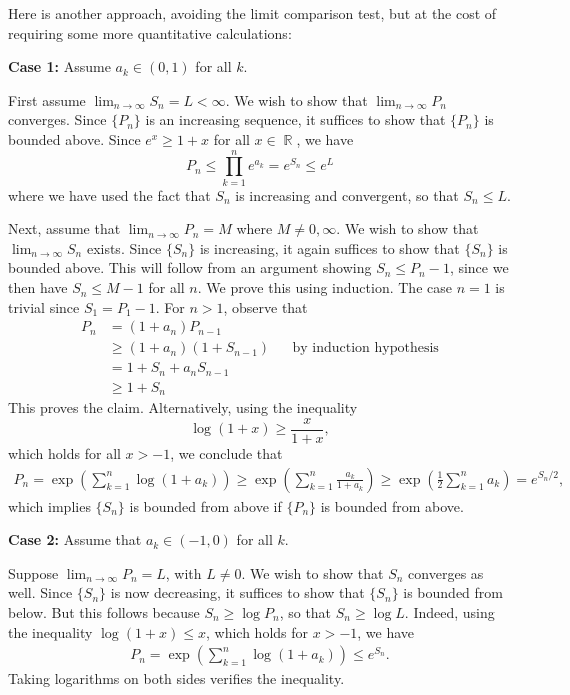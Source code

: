 \documentclass[answers]{exam}
\DeclareMathOperator{\RR}{\mathbb{R}}
\theoremstyle{problemstyle}
\newcommand{\1}[1]{\textbf{1}_{\left[#1\right]}} %
\def\({\left (}
\def\){\right )}
\begin{document}
\begin{questions}
\begin{parts}
\begin{solution}
  	Here is another approach, avoiding the limit comparison test, but at the cost of requiring some more quantitative calculations:

  \textbf{Case 1:} Assume $a_k \in (0,1)$ for all $k$.

  First assume $\lim_{n\to\infty} S_n = L <\infty$. We wish to show that $\lim_{n\to\infty} P_n$ converges. Since $\{ P_n \}$ is an increasing sequence, it suffices to show that $\{ P_n \}$ is bounded above. Since $e^x\geq 1+x$ for all $x \in \RR$, we have
  \begin{equation*}
  P_n \leq \prod_{k=1}^n e^{a_k} = e^{S_n} \leq e^L
  \end{equation*}
  where we have used the fact that $S_n$ is increasing and convergent, so that $S_n \leq L$.
  
  Next, assume that $\lim_{n\to\infty} P_n = M$ where $M \neq 0,\infty$. We wish to show that $\lim_{n\to\infty} S_n$ exists. Since $\{ S_n \}$ is increasing, it again suffices to show that $\{ S_n \}$ is bounded above. This will follow from an argument showing $S_n \leq P_n - 1$, since we then have $S_n \leq M - 1$ for all $n$. We prove this using induction. The case $n=1$ is trivial since $S_1 = P_1 - 1$. For $n>1$, observe that
  \begin{align*}
  P_n 
  &= (1+a_n) P_{n-1}\\
  &\geq (1+a_n)(1+S_{n-1}) &&\text{by induction hypothesis}\\
  &= 1+ S_{n} + a_nS_{n-1}\\
  &\geq 1+S_n
  \end{align*}
  This proves the claim. Alternatively, using the inequality
  \[ \log(1+x)\geq \frac{x}{1+x}, \]
  which holds for all $x>-1$, we conclude that
  \begin{align*}
  P_n = \exp \(\sum_{k=1}^n \log(1+a_k)\) \geq \exp\(\sum_{k=1}^{n} \frac{a_k}{1+a_k} \)\geq \exp\(\frac{1}{2}\sum_{k=1}^n a_k\) = e^{S_n/2},
  \end{align*}
  which implies $\{ S_n \}$ is bounded from above if $\{ P_n \}$ is bounded from above.
  
  \textbf{Case 2:} Assume that $a_k\in (-1,0)$ for all $k$.

  Suppose $\lim_{n\to\infty} P_n = L$, with $L \neq 0$. We wish to show that $S_n$ converges as well. Since $\{ S_n \}$ is now decreasing, it suffices to show that $\{ S_n \}$ is bounded from below. But this follows because $S_n \geq \log P_n$, so that $S_n \geq \log L$. Indeed, using the inequality $\log(1+x)\leq x$, which holds for $x>-1$, we have
  \begin{align*}
  	P_n = \exp \left( \sum_{k=1}^n \log(1+a_k) \right) \leq e^{S_n}.
  \end{align*}
  Taking logarithms on both sides verifies the inequality.
  

\end{solution}
\end{parts}
\end{questions}
\end{document}
